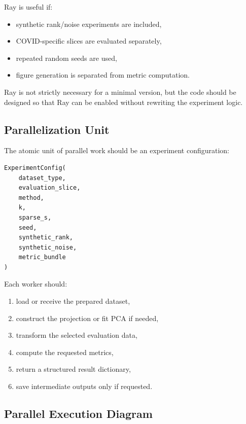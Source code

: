 \documentclass[11pt]{article}
\begin{document}
Ray is useful if:

\begin{itemize}
    \item synthetic rank/noise experiments are included,
    \item COVID-specific slices are evaluated separately,
    \item repeated random seeds are used,
    \item figure generation is separated from metric computation.
\end{itemize}

Ray is not strictly necessary for a minimal version, but the code should be designed so that Ray can be enabled without rewriting the experiment logic.

\subsection{Parallelization Unit}

The atomic unit of parallel work should be an experiment configuration:

\begin{verbatim}
ExperimentConfig(
    dataset_type,
    evaluation_slice,
    method,
    k,
    sparse_s,
    seed,
    synthetic_rank,
    synthetic_noise,
    metric_bundle
)
\end{verbatim}

Each worker should:

\begin{enumerate}
    \item load or receive the prepared dataset,
    \item construct the projection or fit PCA if needed,
    \item transform the selected evaluation data,
    \item compute the requested metrics,
    \item return a structured result dictionary,
    \item save intermediate outputs only if requested.
\end{enumerate}

\subsection{Parallel Execution Diagram}
\end{document}
